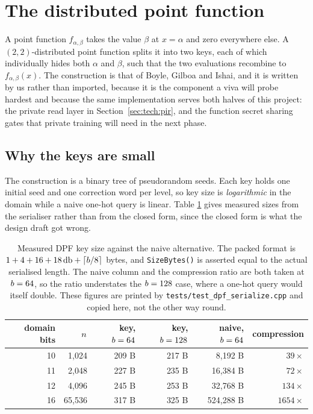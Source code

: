 \section{The distributed point function}
\label{sec:tech:dpf}

A point function $f_{\alpha,\beta}$ takes the value $\beta$ at $x = \alpha$ and
zero everywhere else. A $(2,2)$-distributed point function splits it into two
keys, each of which individually hides both $\alpha$ and $\beta$, such that the
two evaluations recombine to $f_{\alpha,\beta}(x)$. The construction is that of
Boyle, Gilboa and Ishai, and it is written by us rather than imported, because
it is the component a viva will probe hardest and because the same
implementation serves both halves of this project: the private read layer in
Section~\ref{sec:tech:pir}, and the function secret sharing gates that private
training will need in the next phase.

\subsection{Why the keys are small}
\label{sec:tech:dpf:size}

The construction is a binary tree of pseudorandom seeds. Each key holds one
initial seed and one correction word per level, so key size is
\emph{logarithmic} in the domain while a naive one-hot query is linear. Table
\ref{tab:tech:keysize} gives measured sizes from the serialiser rather than
from the closed form, since the closed form is what the design draft got wrong.

\begin{table}[h]
\centering
\small
\caption{Measured DPF key size against the naive alternative. The packed
format is $1 + 4 + 16 + 18\,\mathrm{db} + \lceil b/8 \rceil$ bytes, and
\texttt{SizeBytes()} is asserted equal to the actual serialised length. The naive
column and the compression ratio are both taken at $b = 64$, so the ratio
understates the $b = 128$ case, where a one-hot query would itself double.
These figures are printed by \texttt{tests/test\_dpf\_serialize.cpp} and copied
here, not the other way round.}
\label{tab:tech:keysize}
\begin{tabular}{@{}rrrrrr@{}}
\toprule
domain bits & $n$ & key, $b=64$ & key, $b=128$ & naive, $b=64$ & compression \\
\midrule
10 & 1{,}024  & 209 B & 217 B & 8{,}192 B   & $39\times$ \\
11 & 2{,}048  & 227 B & 235 B & 16{,}384 B  & $72\times$ \\
12 & 4{,}096  & 245 B & 253 B & 32{,}768 B  & $134\times$ \\
16 & 65{,}536 & 317 B & 325 B & 524{,}288 B & $1654\times$ \\
\bottomrule
\end{tabular}
\end{table}

